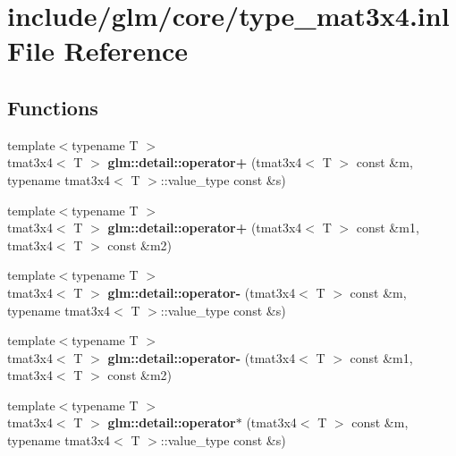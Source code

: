 \hypertarget{type__mat3x4_8inl}{\section{include/glm/core/type\-\_\-mat3x4.inl \-File \-Reference}
\label{type__mat3x4_8inl}
}
\subsection*{\-Functions}
\begin{DoxyCompactItemize}
\item 
\hypertarget{namespaceglm_1_1detail_af9e71c6cf97f956d61f10b9c27187575}{{\footnotesize template$<$typename T $>$ }\\tmat3x4$<$ \-T $>$ {\bfseries glm\-::detail\-::operator+} (tmat3x4$<$ \-T $>$ const \&m, typename tmat3x4$<$ \-T $>$\-::value\-\_\-type const \&s)}\label{namespaceglm_1_1detail_af9e71c6cf97f956d61f10b9c27187575}

\item 
\hypertarget{namespaceglm_1_1detail_a518e23ea531b0c557f491d287f40ebcf}{{\footnotesize template$<$typename T $>$ }\\tmat3x4$<$ \-T $>$ {\bfseries glm\-::detail\-::operator+} (tmat3x4$<$ \-T $>$ const \&m1, tmat3x4$<$ \-T $>$ const \&m2)}\label{namespaceglm_1_1detail_a518e23ea531b0c557f491d287f40ebcf}

\item 
\hypertarget{namespaceglm_1_1detail_ae3018a0dd20a40ded1478628e18a1921}{{\footnotesize template$<$typename T $>$ }\\tmat3x4$<$ \-T $>$ {\bfseries glm\-::detail\-::operator-\/} (tmat3x4$<$ \-T $>$ const \&m, typename tmat3x4$<$ \-T $>$\-::value\-\_\-type const \&s)}\label{namespaceglm_1_1detail_ae3018a0dd20a40ded1478628e18a1921}

\item 
\hypertarget{namespaceglm_1_1detail_a5258db0eacd3094452308efc57796e03}{{\footnotesize template$<$typename T $>$ }\\tmat3x4$<$ \-T $>$ {\bfseries glm\-::detail\-::operator-\/} (tmat3x4$<$ \-T $>$ const \&m1, tmat3x4$<$ \-T $>$ const \&m2)}\label{namespaceglm_1_1detail_a5258db0eacd3094452308efc57796e03}

\item 
\hypertarget{namespaceglm_1_1detail_a29bf71f51bf1eb20acd5bb4f8e7acdcd}{{\footnotesize template$<$typename T $>$ }\\tmat3x4$<$ \-T $>$ {\bfseries glm\-::detail\-::operator$\ast$} (tmat3x4$<$ \-T $>$ const \&m, typename tmat3x4$<$ \-T $>$\-::value\-\_\-type const \&s)}\label{namespaceglm_1_1detail_a29bf71f51bf1eb20acd5bb4f8e7acdcd}


\end{DoxyCompactItemize}
